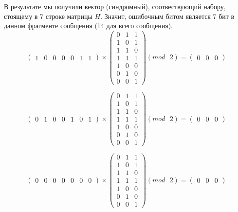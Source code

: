 \documentclass[a5paper, 10pt]{article}
\theoremstyle{definition}
\theoremstyle{plain}
\theoremstyle{remark}
\begin{document}
В результате мы получили вектор (синдромный), соотвествующий набору, стоящему в 7 строке матрицы $H$. Значит, ошибочным битом является 7 бит в данном фрагменте сообщения (14 для всего сообщения).\\
\begin{equation}
\begin{pmatrix}
1 & 0 & 0 & 0 & 0 & 1 & 1
\end{pmatrix}
 \times
\begin{pmatrix}
0 & 1 & 1\\
1 & 0 & 1\\
1 & 1 & 0\\
1 & 1 & 1 \\
1 & 0 & 0\\
0 & 1 & 0 \\
0 & 0 & 1
\end{pmatrix}
(mod \text{ }2)
= \begin{pmatrix}
0 & 0 & 0 
\end{pmatrix}
\end{equation}

\begin{equation}
\begin{pmatrix}
0 & 1 & 0 & 0 & 1 & 0 & 1
\end{pmatrix}
 \times
\begin{pmatrix}
0 & 1 & 1\\
1 & 0 & 1\\
1 & 1 & 0\\
1 & 1 & 1 \\
1 & 0 & 0\\
0 & 1 & 0 \\
0 & 0 & 1
\end{pmatrix}
(mod \text{ }2)
= \begin{pmatrix}
0 & 0 & 0 
\end{pmatrix}
\end{equation}

\begin{equation}
\begin{pmatrix}
0 & 0 & 0 & 0 & 0 & 0 & 0
\end{pmatrix}
 \times
\begin{pmatrix}
0 & 1 & 1\\
1 & 0 & 1\\
1 & 1 & 0\\
1 & 1 & 1 \\
1 & 0 & 0\\
0 & 1 & 0 \\
0 & 0 & 1
\end{pmatrix}
(mod \text{ }2)
= \begin{pmatrix}
0 & 0 & 0 
\end{pmatrix}
\end{equation}
\end{document}
